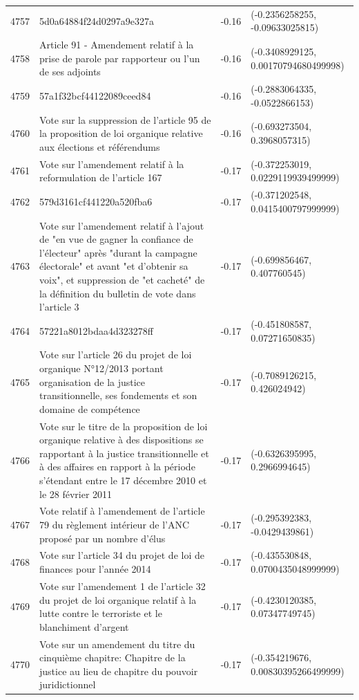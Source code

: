 \begin{table}[ht]
\begin{tabular}{rlrl}
  4757 & 5d0a64884f24d0297a9e327a & -0.16 & (-0.2356258255, -0.09633025815) \\ 
  4758 & Article 91 - Amendement relatif à la prise de parole par rapporteur ou l'un de ses adjoints & -0.16 & (-0.3408929125, 0.00170794680499998) \\ 
  4759 & 57a1f32bcf44122089ceed84 & -0.16 & (-0.2883064335, -0.0522866153) \\ 
  4760 & Vote sur la suppression de l'article 95 de la proposition de loi organique relative aux élections et référendums & -0.16 & (-0.693273504, 0.3968057315) \\ 
  4761 & Vote sur l'amendement relatif à la reformulation de l'article 167 & -0.17 & (-0.372253019, 0.0229119939499999) \\ 
  4762 & 579d3161cf441220a520fba6 & -0.17 & (-0.371202548, 0.0415400797999999) \\ 
  4763 & Vote sur l'amendement relatif à l'ajout de "en vue de gagner la confiance de l'électeur" après "durant la campagne électorale" et avant "et d'obtenir sa voix", et suppression de "et cacheté" de la définition du bulletin de vote dans l'article 3 & -0.17 & (-0.699856467, 0.407760545) \\ 
  4764 & 57221a8012bdaa4d323278ff & -0.17 & (-0.451808587, 0.07271650835) \\ 
  4765 & Vote sur l'article 26 du projet de loi organique N°12/2013 portant organisation de la justice transitionnelle, ses fondements et son domaine de compétence & -0.17 & (-0.7089126215, 0.426024942) \\ 
  4766 & Vote sur le titre de la proposition de loi organique relative à des dispositions se rapportant à la justice transitionnelle et à des affaires en rapport à la période s'étendant entre le 17 décembre 2010 et le 28 février 2011 & -0.17 & (-0.6326395995, 0.2966994645) \\ 
  4767 & Vote relatif à l'amendement de l'article 79 du règlement  intérieur de l'ANC proposé par un nombre d'élus & -0.17 & (-0.295392383, -0.0429439861) \\ 
  4768 & Vote sur l'article 34 du projet de loi de finances pour l'année 2014 & -0.17 & (-0.435530848, 0.0700435048999999) \\ 
  4769 & Vote sur l'amendement 1 de l'article 32 du projet de loi organique relatif à la lutte contre le terroriste et le blanchiment d'argent & -0.17 & (-0.4230120385, 0.07347749745) \\ 
  4770 & Vote sur un amendement du titre du cinquième chapitre: Chapitre de la justice au lieu de chapitre du pouvoir juridictionnel & -0.17 & (-0.354219676, 0.00830395266499999) \\ 

\end{tabular}
\end{table}
